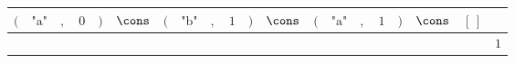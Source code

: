 {\scriptsize\setlength{\tabcolsep}{1.5pt}%
\begin{tabular}{ccccccccccccccccccc|l}
$($ & $\text{"a"}$ & $,$ & $\text{0}$ & $)$ & $\cons$ & $($ & $\text{"b"}$ & $,$ & $\text{1}$ & $)$ & $\cons$ & $($ & $\text{"a"}$ & $,$ & $\text{1}$ & $)$ & $\cons$ & $[\,]$ & \\ \hline
\gcell{$$} & \gcell{$$} & \gcell{$$} & \gcell{$$} & \gcell{$$} & \gcell{$\posC{\circ}$} & \gcell{$$} & \gcell{$$} & \gcell{$$} & \gcell{$$} & \gcell{$$} & \gcell{$$} & \gcell{$$} & \gcell{$$} & \gcell{$$} & \gcell{$$} & \gcell{$$} & \gcell{$$} & \gcell{$$} & $\text{1}$ \\
\end{tabular}}
